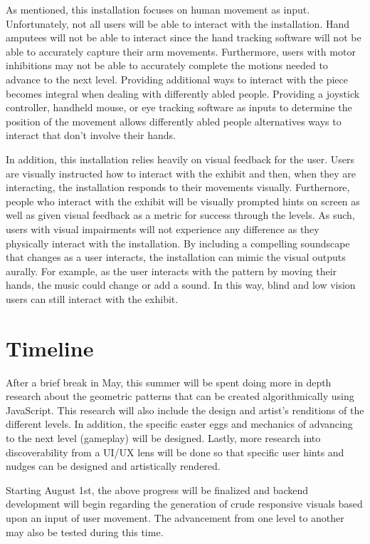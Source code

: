 \documentclass[10pt,twocolumn]{article}
\begin{document}
As mentioned, this installation focuses on human movement as input.  Unfortunately, not all users will be able to interact with the installation.  Hand amputees will not be able to interact since the hand tracking software will not be able to accurately capture their arm movements. Furthermore, users with motor inhibitions may not be able to accurately complete the motions needed to advance to the next level.  Providing additional ways to interact with the piece becomes integral when dealing with differently abled people. Providing a joystick controller, handheld mouse, or eye tracking software as inputs to determine the position of the movement allows differently abled people alternatives ways to interact that don't involve their hands. 

In addition, this installation relies heavily on visual feedback for the user.  Users are visually instructed how to interact with the exhibit and then, when they are interacting, the installation responds to their movements visually.  Furthernore, people who interact with the exhibit will be visually prompted hints on screen as well as given visual feedback as a metric for success through the levels. As such, users with visual impairments will not experience any difference as they physically interact with the installation. By including a compelling soundscape that changes as a user interacts, the installation can mimic the visual outputs aurally. For example, as the user interacts with the pattern by moving their hands, the music could change or add a sound.  In this way, blind and low vision users can still interact with the exhibit. 

\section{Timeline}
After a brief break in May, this summer will be spent doing more in depth research about the geometric patterns that can be created algorithmically using JavaScript.  This research will also include the design and artist's renditions of the different levels.  In addition, the specific easter eggs and mechanics of advancing to the next level (gameplay) will be designed. Lastly, more research into discoverability from a UI/UX lens will be done so that specific user hints and nudges can be designed and artistically rendered.  

Starting August 1st, the above progress will be finalized and backend development will begin regarding the generation of crude responsive visuals based upon an input of user movement.  The advancement from one level to another may also be tested during this time. 
\end{document}

